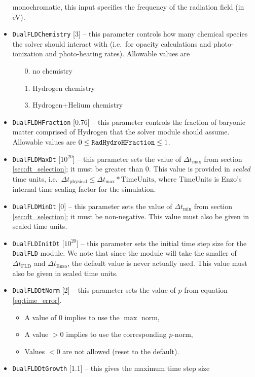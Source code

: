 \documentclass[letterpaper,10pt]{article}
\renewcommand{\(}{\left(}
\renewcommand{\)}{\right)}
\newcommand{\dt}{\Delta t}
\begin{document}
\begin{itemize}
  monochromatic, this input specifies the frequency of the radiation
  field (in eV).
\item {\tt DualFLDChemistry} [3] -- this parameter controls how many
  chemical species the solver should interact with (i.e.~for opacity
  calculations and photo-ionization and photo-heating rates).
  Allowable values are 
  \begin{itemize}
  \item[0.] no chemistry
  \item[1.] Hydrogen chemistry
  \item[3.] Hydrogen+Helium chemistry
  \end{itemize}
\item {\tt DualFLDHFraction} [0.76] -- this parameter controls the
  fraction of baryonic matter comprised of Hydrogen that the solver
  module should assume. Allowable values are $0 \le {\tt
    RadHydroHFraction} \le 1$.
\item {\tt DualFLDMaxDt} [$10^{20}$] -- this parameter sets the value of
  $\dt_{\text{max}}$ from section \ref{sec:dt_selection}; it must be
  greater than 0.  This value is provided in {\em scaled} time units,   
  i.e.~$\dt_{\text{physical}} \le \dt_{\text{max}}*\text{TimeUnits}$, 
  where TimeUnits is Enzo's internal time scaling factor for the
  simulation.
\item {\tt DualFLDMinDt} [0] -- this parameter sets the value of
  $\dt_{\text{min}}$ from section \ref{sec:dt_selection}; it must be
  non-negative.  This value must also be given in scaled time
  units.
\item {\tt DualFLDInitDt} [$10^{20}$] -- this parameter sets the
  initial time step size for the {\tt DualFLD} module.  We note that
  since the module will take the smaller of $\dt_{\text{FLD}}$ and
  $\dt_{\text{Enzo}}$, the default value is never actually used.  This
  value must also be given in scaled time units.
\item {\tt DualFLDDtNorm} [2] -- this parameter sets the value
  of $p$ from equation \eqref{eq:time_error}.  
  \begin{itemize}
  \item A value of $0$ implies to use the $\max$ norm, 
  \item A value $>0$ implies to use the corresponding $p$-norm,
  \item Values $<0$ are not allowed (reset to the default).
  \end{itemize}
\item {\tt DualFLDDtGrowth} [1.1] -- this gives the maximum time step size

\end{itemize}
\end{document}
